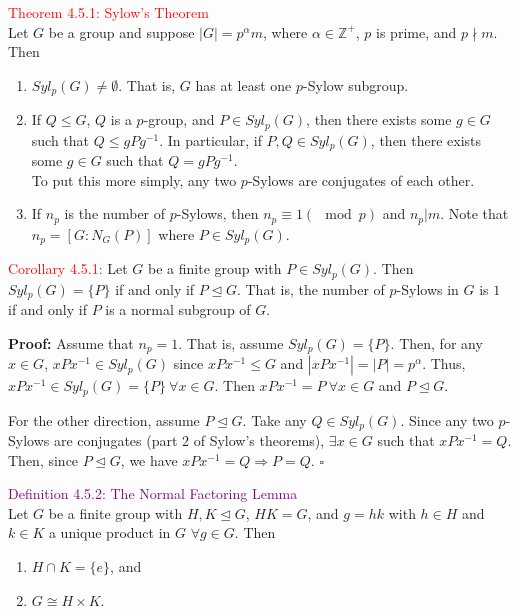 \documentclass{article}
\begin{document}
\textcolor{red}{Theorem 4.5.1: Sylow's Theorem}\\
Let $G$ be a group and suppose $|G| = p^{\alpha}m$, where $\alpha \in \mathbb{Z}^+$, $p$ is prime, and $p \nmid m$. Then
\begin{enumerate}
    \item $Syl_p(G) \neq \emptyset$. That is, $G$ has at least one $p$-Sylow subgroup.
    \item If $Q \leq G$, $Q$ is a $p$-group, and $P \in Syl_p(G)$, then there exists some $g \in G$ such that $Q \leq gPg^{-1}$. In 
    particular, if $P,Q \in Syl_p(G)$, then there exists some $g \in G$ such that $Q = gPg^{-1}$.\\
    To put this more simply, any two $p$-Sylows are conjugates of each other.
    \item If $n_p$ is the number of $p$-Sylows, then $n_p \equiv 1(\mod{p})$ and $n_p | m$. Note that $n_p = [G:N_G(P)]$ where 
    $P \in Syl_p(G)$.
\end{enumerate}

\textcolor{red}{Corollary 4.5.1:} Let $G$ be a finite group with $P \in Syl_p(G)$. Then $Syl_p(G)= \{P\}$ if and only if 
$P \trianglelefteq G$. That is, the number of $p$-Sylows in $G$ is $1$ if and only if $P$ is a normal subgroup of $G$.

\textbf{Proof:} Assume that $n_p = 1$. That is, assume $Syl_p(G) = \{P\}$. Then, for any $x \in G$, $xPx^{-1} \in Syl_p(G)$ since 
$xPx^{-1} \leq G$ and $|xPx^{-1}| = |P| = p^{\alpha}$. Thus, $xPx^{-1} \in Syl_p(G) = \{P\} \ \forall x \in G$. Then 
$xPx^{-1}=P \ \forall x \in G$ and $P \trianglelefteq G$.

For the other direction, assume $P \trianglelefteq G$. Take any $Q \in Syl_p(G)$. Since any two $p$-Sylows are conjugates (part $2$ of 
Sylow's theorems), $\exists x \in G$ such that $xPx^{-1} = Q$. Then, since $P \trianglelefteq G$, we have $xPx^{-1} = Q \Longrightarrow P=Q$. $\square$

\textcolor{purple}{Definition 4.5.2: The Normal Factoring Lemma}\\
Let $G$ be a finite group with $H,K \trianglelefteq G$, $HK = G$, and $g = hk$ with $h \in H$ and $k \in K$ a unique product in $G$ 
$\forall g \in G$. Then
\begin{enumerate}
    \item $H \cap K = \{e\}$, and 
    \item $G \cong H \times K$.
\end{enumerate}
\end{document}
